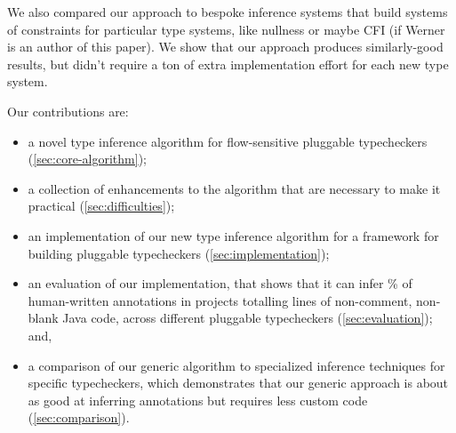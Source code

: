 We also compared our approach to bespoke inference systems that build
systems of constraints for particular type systems, like nullness or
maybe CFI (if Werner is an author of this paper). We show that our approach
produces similarly-good results, but didn't require a ton of extra
implementation effort for each new type system.

Our contributions are:
\begin{itemize}
\item a novel type inference algorithm for flow-sensitive pluggable
  typecheckers (\cref{sec:core-algorithm});
\item a collection of enhancements to the algorithm that are necessary to
  make it practical (\cref{sec:difficulties});
\item an implementation of our new type inference algorithm for a framework
  for building pluggable typecheckers (\cref{sec:implementation});
\item an evaluation of our implementation, that shows that it can infer
  \% of human-written annotations in  projects totalling
   lines of non-comment, non-blank Java code, across  different
  pluggable typecheckers (\cref{sec:evaluation}); and,
\item a comparison of our generic algorithm to specialized inference
  techniques for specific typecheckers, which demonstrates that our generic
  approach is about as good at inferring annotations but requires less
  custom code (\cref{sec:comparison}).
\end{itemize}
